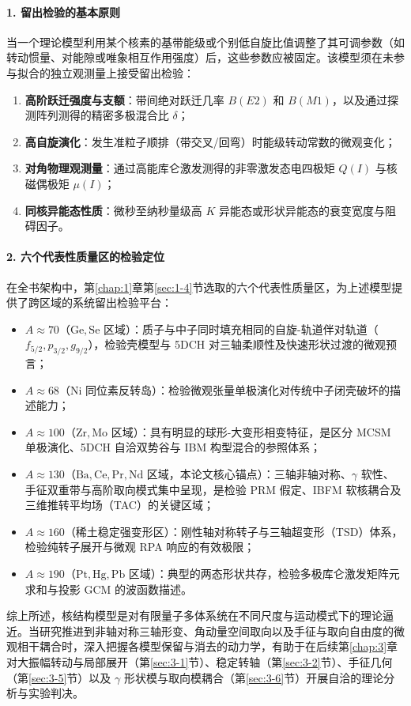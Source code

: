 \paragraph{1. 留出检验的基本原则}
当一个理论模型利用某个核素的基带能级或个别低自旋比值调整了其可调参数（如转动惯量、对能隙或唯象相互作用强度）后，这些参数应被固定。该模型须在未参与拟合的独立观测量上接受留出检验：
\begin{enumerate}
\item \textbf{高阶跃迁强度与支额}：带间绝对跃迁几率 $B(E2)$ 和 $B(M1)$，以及通过探测阵列测得的精密多极混合比 $\delta$；
\item \textbf{高自旋演化}：发生准粒子顺排（带交叉/回弯）时能级转动常数的微观变化；
\item \textbf{对角物理观测量}：通过高能库仑激发测得的非零激发态电四极矩 $Q(I)$ 与核磁偶极矩 $\mu(I)$；
\item \textbf{同核异能态性质}：微秒至纳秒量级高 $K$ 异能态或形状异能态的衰变宽度与阻碍因子。
\end{enumerate}

\paragraph{2. 六个代表性质量区的检验定位}
在全书架构中，第\ref{chap:1}章第\ref{sec:1-4}节选取的六个代表性质量区，为上述模型提供了跨区域的系统留出检验平台：
\begin{itemize}
\item $A \approx 70$（$\mathrm{Ge, Se}$ 区域）：质子与中子同时填充相同的自旋-轨道伴对轨道（$f_{5/2}, p_{3/2}, g_{9/2}$），检验壳模型与 5DCH 对三轴柔顺性及快速形状过渡的微观预言；
\item $A \approx 68$（$\mathrm{Ni}$ 同位素反转岛）：检验微观张量单极演化对传统中子闭壳破坏的描述能力；
\item $A \approx 100$（$\mathrm{Zr, Mo}$ 区域）：具有明显的球形-大变形相变特征，是区分 MCSM 单极演化、5DCH 自洽双势谷与 IBM 构型混合的参照体系；
\item $A \approx 130$（$\mathrm{Ba, Ce, Pr, Nd}$ 区域，本论文核心锚点）：三轴非轴对称、$\gamma$ 软性、手征双重带与高阶取向模式集中呈现，是检验 PRM 假定、IBFM 软核耦合及三维推转平均场（TAC）的关键区域；
\item $A \approx 160$（稀土稳定强变形区）：刚性轴对称转子与三轴超变形（TSD）体系，检验纯转子展开与微观 RPA 响应的有效极限；
\item $A \approx 190$（$\mathrm{Pt, Hg, Pb}$ 区域）：典型的两态形状共存，检验多极库仑激发矩阵元求和与投影 GCM 的波函数描述。
\end{itemize}

综上所述，核结构模型是对有限量子多体系统在不同尺度与运动模式下的理论逼近。当研究推进到非轴对称三轴形变、角动量空间取向以及手征与取向自由度的微观相干耦合时，深入把握各模型保留与消去的动力学，有助于在后续第\ref{chap:3}章对大振幅转动与局部展开（第\ref{sec:3-1}节）、稳定转轴（第\ref{sec:3-2}节）、手征几何（第\ref{sec:3-5}节）以及 $\gamma$ 形状模与取向模耦合（第\ref{sec:3-6}节）开展自洽的理论分析与实验判决。
